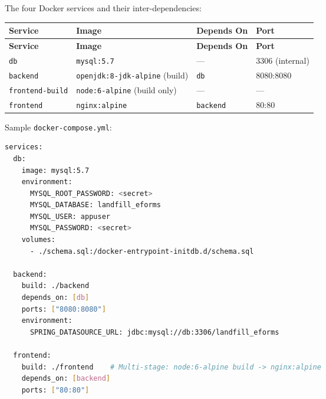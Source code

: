 \documentclass[12pt,letterpaper]{article}
\begin{document}
The four Docker services and their inter-dependencies:

\vspace{0.5em}
\begin{longtable}{p{3cm} p{4.5cm} p{2.8cm} p{2.8cm}}
  \rowcolor{headerblue}
  \color{white}\textbf{Service} &
  \color{white}\textbf{Image} &
  \color{white}\textbf{Depends On} &
  \color{white}\textbf{Port} \\
  \endfirsthead
  \rowcolor{headerblue}
  \color{white}\textbf{Service} &
  \color{white}\textbf{Image} &
  \color{white}\textbf{Depends On} &
  \color{white}\textbf{Port} \\
  \endhead
  \texttt{db}               & \texttt{mysql:5.7}                    & —              & 3306 (internal) \\
  \rowcolor{rowshade}
  \texttt{backend}          & \texttt{openjdk:8-jdk-alpine} (build) & \texttt{db}    & 8080:8080 \\
  \texttt{frontend-build}   & \texttt{node:6-alpine} (build only)   & —              & — \\
  \rowcolor{rowshade}
  \texttt{frontend}         & \texttt{nginx:alpine}                 & \texttt{backend} & 80:80 \\
\end{longtable}

\vspace{0.5em}
Sample \texttt{docker-compose.yml}:

\begin{lstlisting}[language=bash, caption=docker-compose.yml]
services:
  db:
    image: mysql:5.7
    environment:
      MYSQL_ROOT_PASSWORD: <secret>
      MYSQL_DATABASE: landfill_eforms
      MYSQL_USER: appuser
      MYSQL_PASSWORD: <secret>
    volumes:
      - ./schema.sql:/docker-entrypoint-initdb.d/schema.sql

  backend:
    build: ./backend
    depends_on: [db]
    ports: ["8080:8080"]
    environment:
      SPRING_DATASOURCE_URL: jdbc:mysql://db:3306/landfill_eforms

  frontend:
    build: ./frontend    # Multi-stage: node:6-alpine build -> nginx:alpine
    depends_on: [backend]
    ports: ["80:80"]
\end{lstlisting}
\end{document}
